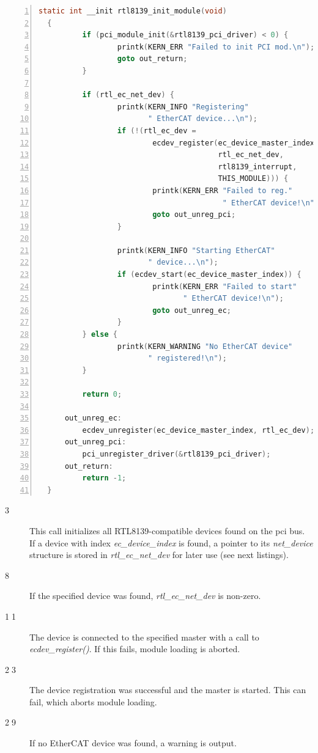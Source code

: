 \documentclass[a4paper,12pt,BCOR6mm,bibtotoc,idxtotoc]{scrbook}
\newcommand{\linenum}[1]{\normalfont\textcircled{\tiny #1}}
\begin{document}
\begin{lstlisting}[gobble=2,language=C,numbers=left]
  static int __init rtl8139_init_module(void)
  {
          if (pci_module_init(&rtl8139_pci_driver) < 0) {
                  printk(KERN_ERR "Failed to init PCI mod.\n");
                  goto out_return;
          }

          if (rtl_ec_net_dev) {
                  printk(KERN_INFO "Registering"
                         " EtherCAT device...\n");
                  if (!(rtl_ec_dev =
                          ecdev_register(ec_device_master_index,
                                         rtl_ec_net_dev,
                                         rtl8139_interrupt,
                                         THIS_MODULE))) {
                          printk(KERN_ERR "Failed to reg."
                                          " EtherCAT device!\n");
                          goto out_unreg_pci;
                  }

                  printk(KERN_INFO "Starting EtherCAT"
                         " device...\n");
                  if (ecdev_start(ec_device_master_index)) {
                          printk(KERN_ERR "Failed to start"
                                 " EtherCAT device!\n");
                          goto out_unreg_ec;
                  }
          } else {
                  printk(KERN_WARNING "No EtherCAT device"
                         " registered!\n");
          }

          return 0;

      out_unreg_ec:
          ecdev_unregister(ec_device_master_index, rtl_ec_dev);
      out_unreg_pci:
          pci_unregister_driver(&rtl8139_pci_driver);
      out_return:
          return -1;
  }
\end{lstlisting}

\begin{description}
\item[\linenum{3}] This call initializes all
  RTL8139-compatible devices found on the pci bus. If a device with
  index \textit{ec\_device\_index} is found, a pointer to its
  \textit{net\_device} structure is stored in
  \textit{rtl\_ec\_net\_dev} for later use (see next listings).
\item[\linenum{8}] If the specified device was
  found, \textit{rtl\_ec\_net\_dev} is non-zero.
\item[\linenum{11}] The device is connected to
  the specified master with a call to \textit{ecdev\_register()}. If
  this fails, module loading is aborted.
\item[\linenum{23}] The device registration was
  successful and the master is started. This can fail, which aborts
  module loading.
\item[\linenum{29}] If no EtherCAT device was
  found, a warning is output.
\end{description}
\end{document}
